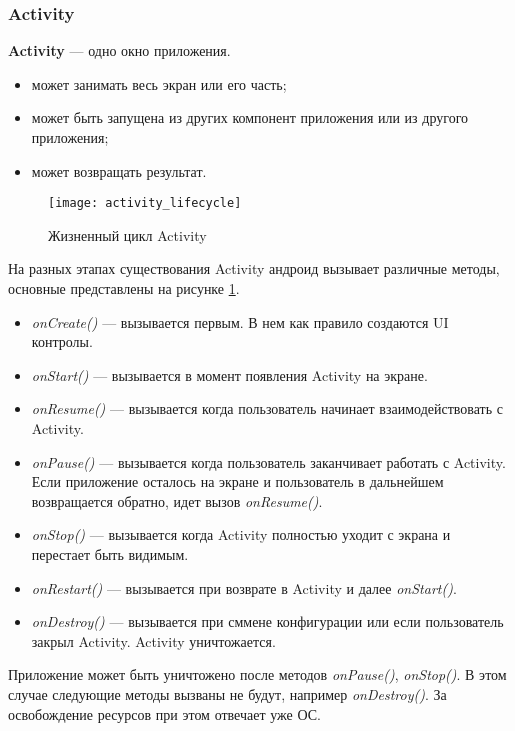 \subsubsection{Activity}
\textbf{Activity} --- одно окно приложения.

\begin{itemize}
	\item может занимать весь экран или его часть;
	\item может быть запущена из других компонент приложения или из другого приложения;
	\item может возвращать результат.
\end{itemize}

\begin{figure}[H]
    \centering
    \texttt{[image: activity\_lifecycle]}
    \caption{Жизненный цикл Activity}
    \label{fig:activity_lifecycle}
\end{figure}

На разных этапах существования Activity андроид вызывает различные методы, основные представлены на рисунке \ref{fig:activity_lifecycle}.

\begin{itemize}
	\item \textit{onCreate()} --- вызывается первым. В нем как правило создаются UI контролы.
	\item \textit{onStart()} --- вызывается в момент появления Activity на экране.
	\item \textit{onResume()} --- вызывается когда пользователь начинает взаимодействовать с Activity.
	\item \textit{onPause()} --- вызывается когда пользователь заканчивает работать с Activity. Если приложение осталось на экране и пользователь в дальнейшем возвращается обратно, идет вызов \textit{onResume()}.
	\item \textit{onStop()} --- вызывается когда Activity полностью уходит с экрана и перестает быть видимым.
	\item \textit{onRestart()} --- вызывается при возврате в Activity и далее \textit{onStart()}.
	\item \textit{onDestroy()} --- вызывается при сммене конфигурации или если пользователь закрыл Activity. Activity уничтожается.
\end{itemize}

Приложение может быть уничтожено после методов \textit{onPause()}, \textit{onStop()}. В этом случае следующие методы вызваны не будут, например \textit{onDestroy()}. За освобождение ресурсов при этом отвечает уже ОС.

